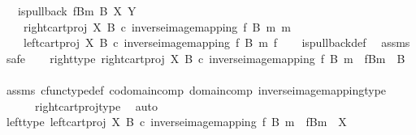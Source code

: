 \begin{isabellebody}
\ \ \ {\isachardoublequoteopen}is{\isacharunderscore}{\kern0pt}pullback\ {\isacharparenleft}{\kern0pt}f\isactrlsup {\isacharminus}{\kern0pt}B{\isasymrparr}\isactrlbsub m\isactrlesub {\isacharparenright}{\kern0pt}\ B\ X\ Y\ \isanewline
\ \ \ \ {\isacharparenleft}{\kern0pt}right{\isacharunderscore}{\kern0pt}cart{\isacharunderscore}{\kern0pt}proj\ X\ B\ {\isasymcirc}\isactrlsub c\ inverse{\isacharunderscore}{\kern0pt}image{\isacharunderscore}{\kern0pt}mapping\ f\ B\ m{\isacharparenright}{\kern0pt}\ m\isanewline
\ \ \ \ {\isacharparenleft}{\kern0pt}left{\isacharunderscore}{\kern0pt}cart{\isacharunderscore}{\kern0pt}proj\ X\ B\ {\isasymcirc}\isactrlsub c\ inverse{\isacharunderscore}{\kern0pt}image{\isacharunderscore}{\kern0pt}mapping\ f\ B\ m{\isacharparenright}{\kern0pt}\ f{\isachardoublequoteclose}\isanewline
%
\isadelimproof
\ \ %
\endisadelimproof
%
\isatagproof
{}\isamarkupfalse%
\ is{\isacharunderscore}{\kern0pt}pullback{\isacharunderscore}{\kern0pt}def\ \isamarkupfalse%
\ assms\isanewline
{}\isamarkupfalse%
\ safe\isanewline
\ \ \isamarkupfalse%
\ right{\isacharunderscore}{\kern0pt}type{\isacharcolon}{\kern0pt}\ {\isachardoublequoteopen}right{\isacharunderscore}{\kern0pt}cart{\isacharunderscore}{\kern0pt}proj\ X\ B\ {\isasymcirc}\isactrlsub c\ inverse{\isacharunderscore}{\kern0pt}image{\isacharunderscore}{\kern0pt}mapping\ f\ B\ m\ {\isacharcolon}{\kern0pt}\ f\isactrlsup {\isacharminus}{\kern0pt}B{\isasymrparr}\isactrlbsub m\isactrlesub \ {\isasymrightarrow}\ B{\isachardoublequoteclose}\isanewline
\ \ \ \ \isamarkupfalse%
\ assms\ cfunc{\isacharunderscore}{\kern0pt}type{\isacharunderscore}{\kern0pt}def\ codomain{\isacharunderscore}{\kern0pt}comp\ domain{\isacharunderscore}{\kern0pt}comp\ inverse{\isacharunderscore}{\kern0pt}image{\isacharunderscore}{\kern0pt}mapping{\isacharunderscore}{\kern0pt}type\isanewline
\ \ \ \ \ \ right{\isacharunderscore}{\kern0pt}cart{\isacharunderscore}{\kern0pt}proj{\isacharunderscore}{\kern0pt}type\ \isamarkupfalse%
\ auto\isanewline
\ \ \isamarkupfalse%
\ left{\isacharunderscore}{\kern0pt}type{\isacharcolon}{\kern0pt}\ {\isachardoublequoteopen}left{\isacharunderscore}{\kern0pt}cart{\isacharunderscore}{\kern0pt}proj\ X\ B\ {\isasymcirc}\isactrlsub c\ inverse{\isacharunderscore}{\kern0pt}image{\isacharunderscore}{\kern0pt}mapping\ f\ B\ m\ {\isacharcolon}{\kern0pt}\ f\isactrlsup {\isacharminus}{\kern0pt}B{\isasymrparr}\isactrlbsub m\isactrlesub \ {\isasymrightarrow}\ X{\isachardoublequoteclose}\isanewline

\end{isabellebody}
